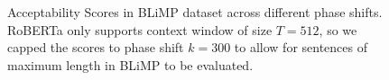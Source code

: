 \begin{figure}
    \centering
    \caption{Acceptability Scores in BLiMP \cite{warstadt-etal-2020-BLiMP-benchmark} dataset across different phase shifts. RoBERTa only supports context window of size $T=512$, so we capped the scores to phase shift $k=300$ to allow for sentences of maximum length in BLiMP to be evaluated.}
    \label{fig:acceptability}
\end{figure}

